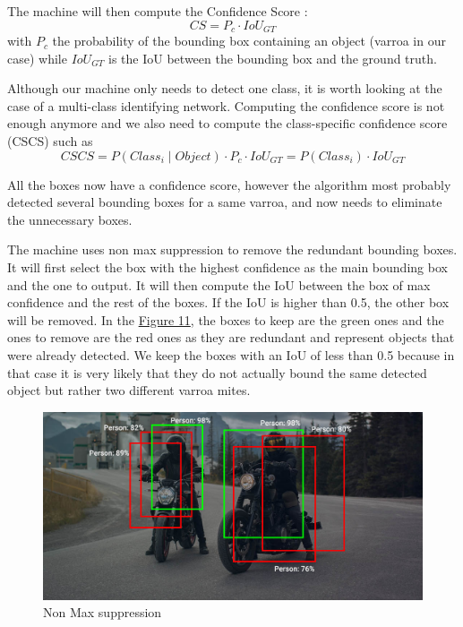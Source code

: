 \documentclass{article}
\begin{document}
\bigskip
\bigskip

The machine will then compute the Confidence Score : $$CS = P_c \cdot IoU_{GT}$$ with $P_c$ the probability of the bounding box containing an object (varroa in our case) while $IoU_{GT}$ is the IoU between the bounding box and the ground truth.

\bigskip

Although our machine only needs to detect one class, it is worth looking at the case of a multi-class identifying network. Computing the confidence score is not enough anymore and we also need to compute the class-specific confidence score (CSCS) such as 
$$CSCS = P(Class_i \mid Object) \cdot P_c \cdot IoU_{GT} = P(Class_i) \cdot IoU_{GT}$$

\bigskip

All the boxes now have a confidence score, however the algorithm most probably detected several bounding boxes for a same varroa, and now needs to eliminate the unnecessary boxes.

\bigskip

The machine uses  non max suppression to remove the redundant bounding boxes. It will first select the box with the highest confidence as the main bounding box and the one to output. It will then compute the IoU between the box of max confidence and the rest of the boxes. If the IoU is higher than 0.5, the other box will be removed. In the \hyperref[Figure 11]{Figure 11}, the boxes to keep are the green ones and the ones to remove are the red ones as they are redundant and represent objects that were already detected. We keep the boxes with an IoU of less than 0.5 because in that case it is very likely that they do not actually bound the same detected object but rather two different varroa mites.

\begin{figure}[!ht]
  \centering
  \includegraphics[scale=0.35]{metrics/nonmaxsuppression.jpg}
  \caption{Non Max suppression ~\cite{nonmax}}
  \label{Figure 11}
\end{figure}
\end{document}

